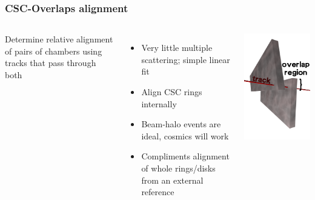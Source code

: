 \documentclass[compress]{beamer}
\begin{document}
\begin{frame}
\frametitle{CSC-Overlaps alignment}

\begin{columns}

Determine relative alignment of pairs of chambers using tracks that pass through both

\begin{itemize}
\item Very little multiple scattering; simple linear fit
\item Align CSC rings internally
\item Beam-halo events are ideal, cosmics will work
\item Compliments alignment of whole rings/disks from an external reference
\end{itemize}

\includegraphics[width=\linewidth]{overlap.png}
\end{columns}


\end{frame}
\end{document}
